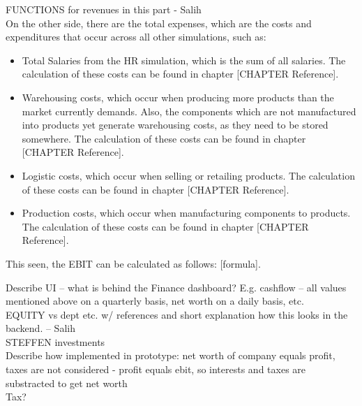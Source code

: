 FUNCTIONS for revenues in this part - Salih\\

On the other side, there are the total expenses, which are the costs and expenditures that occur across all other simulations, such as:
\begin{itemize}
    \item Total Salaries from the HR simulation, which is the sum of all salaries. The calculation of these costs can be found in chapter [CHAPTER Reference].
    \item Warehousing costs, which occur when producing more products than the market currently demands. Also, the components which are not manufactured into products yet generate warehousing costs, as they need to be stored somewhere. The calculation of these costs can be found in chapter [CHAPTER Reference]. 
    \item Logistic costs, which occur when selling or retailing products. The calculation of these costs can be found in chapter [CHAPTER Reference].
    \item Production costs, which occur when manufacturing components to products. The calculation of these costs can be found in chapter [CHAPTER Reference].
\end{itemize}

This seen, the EBIT can be calculated as follows: [formula]. 

Describe UI – what is behind the Finance dashboard? E.g. cashflow – all values mentioned above on a quarterly basis, net worth on a daily basis, etc.\\

EQUITY vs dept etc. w/ references and short explanation how this looks in the backend. – Salih \\

STEFFEN investments\\

Describe how implemented in prototype: net worth of company equals profit, taxes are not considered - profit equals ebit, so interests and taxes are substracted to get net worth\\

Tax?